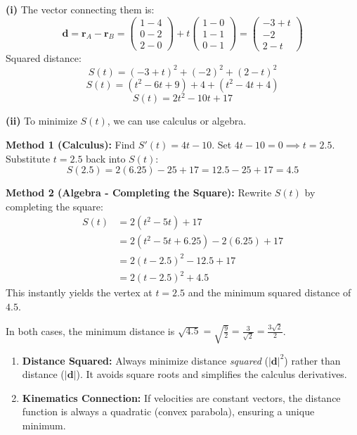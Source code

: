 \begin{solution}
\textbf{(i)} The vector connecting them is:
\[ \mathbf{d} = \mathbf{r}_A - \mathbf{r}_B = \begin{pmatrix} 1-4 \\ 0-2 \\ 2-0 \end{pmatrix} + t \begin{pmatrix} 1-0 \\ 1-1 \\ 0-1 \end{pmatrix} = \begin{pmatrix} -3+t \\ -2 \\ 2-t \end{pmatrix} \]
Squared distance:
\[ S(t) = (-3+t)^2 + (-2)^2 + (2-t)^2 \]
\[ S(t) = (t^2 - 6t + 9) + 4 + (t^2 - 4t + 4) \]
\[ S(t) = 2t^2 - 10t + 17 \]

\textbf{(ii)} To minimize $S(t)$, we can use calculus or algebra.

\textbf{Method 1 (Calculus):}
Find $S'(t) = 4t - 10$.
Set $4t - 10 = 0 \implies t = 2.5$.
Substitute $t=2.5$ back into $S(t)$:
\[ S(2.5) = 2(6.25) - 25 + 17 = 12.5 - 25 + 17 = 4.5 \]

\textbf{Method 2 (Algebra - Completing the Square):}
Rewrite $S(t)$ by completing the square:
\begin{align*}
    S(t) &= 2(t^2 - 5t) + 17 \\
    &= 2\left(t^2 - 5t + 6.25\right) - 2(6.25) + 17 \\
    &= 2(t - 2.5)^2 - 12.5 + 17 \\
    &= 2(t - 2.5)^2 + 4.5
\end{align*}
This instantly yields the vertex at $t = 2.5$ and the minimum squared distance of $4.5$.

In both cases, the minimum distance is $\sqrt{4.5} = \sqrt{\frac{9}{2}} = \frac{3}{\sqrt{2}} = \frac{3\sqrt{2}}{2}$.
\end{solution}

\begin{takeaways}
\begin{enumerate}
    \item \textbf{Distance Squared:} Always minimize distance \textit{squared} ($|\mathbf{d}|^2$) rather than distance ($|\mathbf{d}|$). It avoids square roots and simplifies the calculus derivatives.
    \item \textbf{Kinematics Connection:} If velocities are constant vectors, the distance function is always a quadratic (convex parabola), ensuring a unique minimum.
\end{enumerate}
\end{takeaways}

